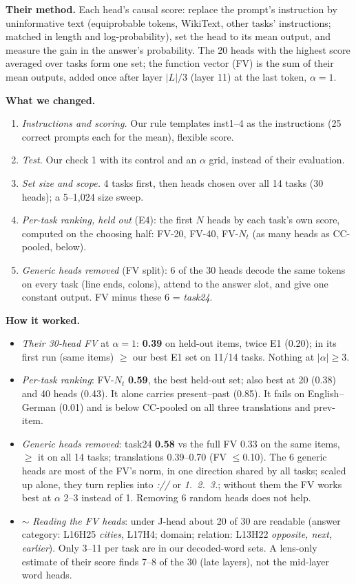 \documentclass[10pt,a4paper]{article}
\newcommand{\yes}{\textcolor{green!45!black}{\ding{51}}}
\newcommand{\mixed}{\textcolor{orange!80!black}{$\sim$}}
\begin{document}
\textbf{Their method.} Each head's causal score: replace the prompt's instruction by uninformative text (equiprobable tokens, WikiText, other tasks' instructions; matched in length and log-probability), set the head to its mean output, and measure the gain in the answer's probability. The 20 heads with the highest score averaged over tasks form one set; the function vector (FV) is the sum of their mean outputs, added once after layer $|L|/3$ (layer 11) at the last token, $\alpha=1$.

\textbf{What we changed.}
\begin{enumerate}
\item \emph{Instructions and scoring.} Our rule templates inst1--4 as the instructions (25 correct prompts each for the mean), flexible score.
\item \emph{Test.} Our check 1 with its control and an $\alpha$ grid, instead of their evaluation.
\item \emph{Set size and scope.} 4 tasks first, then heads chosen over all 14 tasks (30 heads); a 5--1{,}024 size sweep.
\item \emph{Per-task ranking, held out} (E4): the first $N$ heads by each task's own score, computed on the choosing half: FV-20, FV-40, FV-$N_t$ (as many heads as CC-pooled, below).
\item \emph{Generic heads removed} (FV split): 6 of the 30 heads decode the same tokens on every task (line ends, colons), attend to the answer slot, and give one constant output. FV minus these 6 = \emph{task24}.
\end{enumerate}

\textbf{How it worked.}
\begin{itemize}
\item \yes{} \emph{Their 30-head FV} at $\alpha=1$: \textbf{0.39} on held-out items, twice E1 (0.20); in its first run (same items) $\geq$ our best E1 set on 11/14 tasks. Nothing at $|\alpha|\geq 3$.
\item \yes{} \emph{Per-task ranking}: FV-$N_t$ \textbf{0.59}, the best held-out set; also best at 20 (0.38) and 40 heads (0.43). It alone carries present--past (0.85). It fails on English--German (0.01) and is below CC-pooled on all three translations and prev-item.
\item \yes{} \emph{Generic heads removed}: task24 \textbf{0.58} vs the full FV 0.33 on the same items, $\geq$ it on all 14 tasks; translations 0.39--0.70 (FV $\leq$0.10). The 6 generic heads are most of the FV's norm, in one direction shared by all tasks; scaled up alone, they turn replies into \emph{://} or \emph{1.\ 2.\ 3.}; without them the FV works best at $\alpha$ 2--3 instead of 1. Removing 6 random heads does not help.
\item \mixed{} \emph{Reading the FV heads}: under J-head about 20 of 30 are readable (answer category: L16H25 \emph{cities}, L17H4; domain; relation: L13H22 \emph{opposite, next, earlier}). Only 3--11 per task are in our decoded-word sets. A lens-only estimate of their score finds 7--8 of the 30 (late layers), not the mid-layer word heads.
\end{itemize}
\end{document}
